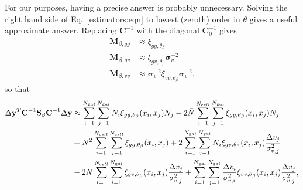 \documentclass{article}
\begin{document}
For our purposes, having a precise answer is probably unnecessary.
Solving the right hand side of Eq.~\ref{estimators:eqn} to lowest (zeroth) order in $\theta$ gives a useful approximate answer.  Replacing
$\textbf{C}^{-1}$ with the diagonal $\textbf{C}_0^{-1}$ gives
\begin{align*}
\textbf{M}_{\beta,gg} & \approx \xi_{gg,\theta_\beta}\\
\textbf{M}_{\beta,gv} & \approx \xi_{gv,\theta_\beta} \bm{\sigma}^{-2}_v\\
\textbf{M}_{\beta,vv} & \approx \bm{\sigma}^{-2}_v \xi_{vv,\theta_\beta} \bm{\sigma}^{-2}_v .
\end{align*}
so that
\begin{align*}
\Delta \textbf{y}^T \textbf{C}^{-1} \textbf{S}_\beta \textbf{C}^{-1} \Delta \textbf{y}  
&\approx \sum_{i=1}^{N_{\text gal}}  \sum_{j=1}^{N_{\text gal}} N_i \xi_{gg,\theta_\beta}(x_i,x_j) N_j 
 - 2\bar{N}   \sum_{i=1}^{N_{\text cell}} \sum_{j=1}^{N_{\text gal}}  \xi_{gg,\theta_\beta}(x_i,x_j)N_j \\
& +\bar{N}^2 \sum_{i=1}^{N_{\text cell}} \sum_{j=1}^{N_{\text cell}} \xi_{gg,\theta_\beta}(x_i,x_j)
 +   2 \sum_{i=1}^{N_{\text gal}}  \sum_{j=1}^{N_{\text gal}}  N_i  \xi_{gv,\theta_\beta}(x_i,x_j)\frac{\Delta v_j}{\sigma^2_{v,j}} \\
& -   2 \bar{N}  \sum_{i=1}^{N_{\text cell}} \sum_{i=1}^{N_{\text gal}}   \xi_{gv,\theta_\beta}(x_i,x_j) \frac{\Delta v_j}{\sigma^2_{v,j}} 
+ \sum_{i=1}^{N_{\text gal}}  \sum_{j=1}^{N_{\text gal}}   \frac{\Delta v_i}{\sigma^2_{v,i}}  \xi_{vv,\theta_\beta}(x_i,x_j)  \frac{\Delta v_j}{\sigma^2_{v,j}},\\
\end{align*}
\end{document}
